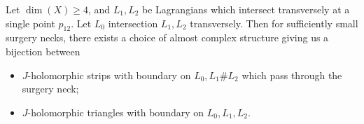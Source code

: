%


    Let $\dim(X)\geq 4$, and $L_1, L_2$ be Lagrangians which intersect transversely at a single point $p_{12}$. Let $L_0$ intersection $L_1, L_2$ transversely. Then for sufficiently small surgery necks, there exists a choice of almost complex structure giving us a bijection between
    \begin{itemize}
        \item $J$-holomorphic strips with boundary on $L_0, L_1\# L_2$ which pass through the surgery neck;
        \item $J$-holomorphic triangles with boundary on $L_0, L_1, L_2$.
    \end{itemize}
